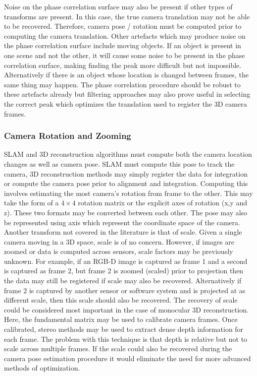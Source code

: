 Noise on the phase correlation surface may also be present if other types of transforms are present. In this case, the true camera translation may not be able to be recovered. Therefore, camera pose / rotation must be computed prior to computing the camera translation. Other artefacts which may produce noise on the phase correlation surface include moving objects. If an object is present in one scene and not the other, it will cause some noise to be present in the phase correlation surface, making finding the peak more difficult but not impossible. Alternatively if there is an object whose location is changed between frames, the same thing may happen. The phase correlation procedure should be robust to these artefacts already but filtering approaches may also prove useful in selecting the correct peak which optimizes the translation used to register the 3D camera frames. \\

\subsubsection{Camera Rotation and Zooming}
\label{Sec:RoteZoomingSection}
SLAM and 3D reconstruction algorithms must compute both the camera location changes as well as camera pose. SLAM must compute this pose to track the camera, 3D reconstruction methods may simply register the data for integration or compute the camera pose prior to alignment and integration. Computing this involves estimating the most camera's rotation from frame to the other. This may take the form of a $4 \times 4$ rotation matrix or the explicit axes of rotation (x,y and z). These two formats may be converted between each other. The pose may also be represented using axis which represent the coordinate space of the camera. \\

Another transform not covered in the literature is that of scale. Given a single camera moving in a 3D space, scale is of no concern. However, if images are zoomed or data is computed across sensors, scale factors may be previously unknown. For example, if an RGB-D image is captured as frame 1 and a second is captured as frame 2, but frame 2 is zoomed (scaled) prior to projection then the data may still be registered if scale may also be recovered. Alternatively if frame 2 is captured by another sensor or software system and is projected at as different scale, then this scale should also be recovered. The recovery of scale could be considered most important in the case of monocular 3D reconstruction. Here, the fundamental matrix may be used to calibrate camera frames. Once calibrated, stereo methods may be used to extract dense depth information for each frame. The problem with this technique is that depth is relative but not to scale across multiple frames. If the scale could also be recovered during the camera pose estimation procedure it would eliminate the need for more advanced methods of optimization. \\ 

